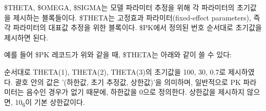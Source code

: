 \documentclass[
  10pt,
  krantz2,
  a4paper]{krantz}
\newenvironment{Shaded}{\begin{snugshade}}{\end{snugshade}}
\newcommand{\DecValTok}[1]{\textcolor[rgb]{0.00,0.00,0.81}{#1}}
\newcommand{\FloatTok}[1]{\textcolor[rgb]{0.00,0.00,0.81}{#1}}
\newcommand{\KeywordTok}[1]{\textcolor[rgb]{0.13,0.29,0.53}{\textbf{#1}}}
\newcommand{\NormalTok}[1]{#1}
\newcommand{\OperatorTok}[1]{\textcolor[rgb]{0.81,0.36,0.00}{\textbf{#1}}}
\newcommand{\StringTok}[1]{\textcolor[rgb]{0.31,0.60,0.02}{#1}}
\theoremstyle{definition}
\theoremstyle{definition}
\theoremstyle{definition}
\theoremstyle{remark}
\begin{document}
\$THETA, \$OMEGA, \$SIGMA는 모델 파라미터 추정을 위해 각 파라미터의 초기값을 제시하는 블록들이다. \$THETA는 고정효과 파라미터(fixed-effect parameters), 즉 각 파라미터의 대표값 추정을 위한 블록이다. \$PK에서 정의된 번호 순서대로 초기값을 제시하면 된다.

\begin{Shaded}
\end{Shaded}

예를 들어 \$PK 레코드가 위와 같을 때, \$THETA는 아래와 같이 쓸 수 있다:

\begin{Shaded}
\end{Shaded}

순서대로 THETA(1), THETA(2), THETA(3)의 초기값을 100, 30, 0.7로 제시하였다. 괄호 안의 값은 '(하한값, 초기 추정값, 상한값)'을 의미하며, 일반적으로 PK 파라미터는 음수인 경우가 없기 때문에, 하한값을 0으로 정의한다. 상한값을 제시하지 않으면, 10\textsubscript{6}이 기본 상한값이다.
\end{document}

